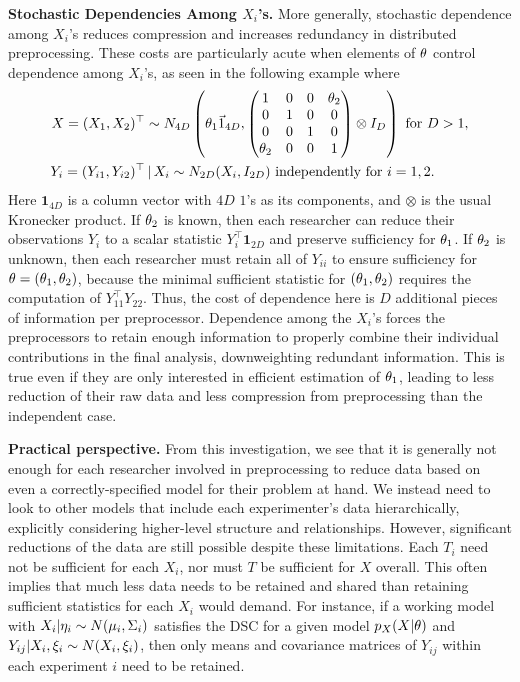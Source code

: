 \medskip
\noindent
{\bf Stochastic Dependencies Among $X_i$'s.} More generally,  stochastic  dependence among $X_i$'s    reduces compression and increases redundancy in distributed preprocessing.
These costs are particularly acute when elements of $\theta$ control dependence among $X_i$'s, as seen in the following example where
\begin{align}
 \nonumber
 X = (X_1, X_2)^\top &\sim N_{4D}\left(\theta_1 \vec 1_{4D},  \begin{pmatrix} 
1 & 0 & 0 & \theta_2 \\
0 & 1 & 0 & 0 \\
0 & 0 & 1 & 0 \\
\theta_2 & 0 & 0 & 1
\end{pmatrix} \otimes I_{D} \right)\mbox{ for }D > 1, \\
 \nonumber
 Y_i = (Y_{i1}, Y_{i2})^\top &\, | \, X_i\sim N_{2D}(X_i, I_{2D})  \mbox{ independently for\ } i=1,2.
\end{align}
Here $\bm 1_{4D}$ is a column vector with $4D$ $1$'s as its components, and $\otimes$ is the usual Kronecker product.  
If $\theta_2$ is known, then each researcher can reduce their observations $Y_i$ to a scalar statistic $Y_i^\top \bm 1_{2D}$ and preserve sufficiency for $\theta_1$.
If $\theta_2$ is unknown, then each researcher must retain all of $Y_{ii}$ to ensure sufficiency for $\theta = (\theta_1, \theta_2)$, because the minimal sufficient statistic for $(\theta_1, \theta_2)$ requires the computation of $Y_{11}^\top Y_{22}$.
Thus, the cost of dependence here is $D$ additional pieces of information per preprocessor.
%
Dependence among the $X_i$'s forces the preprocessors to retain enough information to properly combine their individual contributions in the final analysis, downweighting redundant information.
This is true even if they are only interested in efficient estimation of $\theta_1$, leading to less reduction of their raw data and less compression from preprocessing than the independent case.


\medskip
\noindent
{\bf Practical perspective.}
From this investigation, we see that it is generally not enough for each researcher involved in preprocessing to reduce data based on even a correctly-specified model for their problem at hand.
We instead need to look to other models that include each experimenter's data hierarchically, explicitly considering higher-level structure and relationships.
However, significant reductions of the data are still possible despite these limitations.
Each $T_i$ need not be sufficient for each $X_i$, nor must $T$ be sufficient for $X$ overall.
This often implies that much less data needs to be retained and shared than  retaining sufficient statistics for each $X_i$ would demand.
For instance, if a working model with $X_i | \eta_i \sim N(\mu_i, \Sigma_i)$ satisfies the DSC for a given model $p_X(X | \theta)$ and $Y_{ij} | X_i, \xi_i \sim N(X_i, \xi_i)$, then only means and covariance matrices of $Y_{ij}$ within each experiment $i$ need to be retained.

